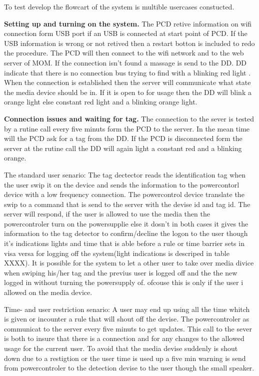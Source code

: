 To test develop the flowcart of the system is multible usercases constucted.

\textbf{Setting up and turning on the system.} \n
The PCD retive information on wifi connection form USB port if an USB is connected at start point of PCD. 
If the USB information is wrong or not retived then a restart botton is included to redo the procedure.  
The PCD will then connect to the wifi network and to the web server of MOM. If the connection isn't found a massage is send to the DD. DD indicate that there is no connection bus trying to find with a blinking red light . When the connection is established then the server will communicate what state the media device should be in. If it is open to for usage then the DD will blink a orange light else constant red light and a blinking orange light. 

\textbf{Connection issues and waiting for tag.} \n
The connection to the sever is tested by a rutine call every five minuts form the PCD to the server. In the mean time will the PCD ask for a tag from the DD. If the PCD is disconnected form the server at the rutine call the DD will again light a constant red and a blinking orange.    
  


The standard user senario:
The tag dectector reads the identification tag when the user swip it on the device and sends the information to the powercontorl device with a low frequency connection.
The powercontrol device translate the swip to a command that is send to the server with the devise id and tag id. The server will respond, if the user is allowed to use the media then the powercontroler turn on the powersupplie else it dosn't in both cases it gives the information to the tag detector to confirm/decline the logon to the user though it's indications lights and time that is able before a rule or time barrier sets in visa versa for logging off the system(light indications is descriped in table XXXX). It is possible for the system to let a other user to take over media divice when swiping his/her tag and the previus user is logged off and the the new logged in without turning the powersupply of. ofcouse this is only if the user i allowed on the media device. 

Time- and user restriction senario:
A user may end up using all the time whitch is given or incounter a rule that will shout off the devise. The powercontroler as communicat to the server every five minuts to get updates. This call to the sever is both to insure that there is a connection and for any changes to the allowed usage for the current user. To avoid that the media devise suddenly is shout down due to a restigtion or the user time is used up a five min warning is send from powercontroler to the detection devise to the user though the small speaker. 

